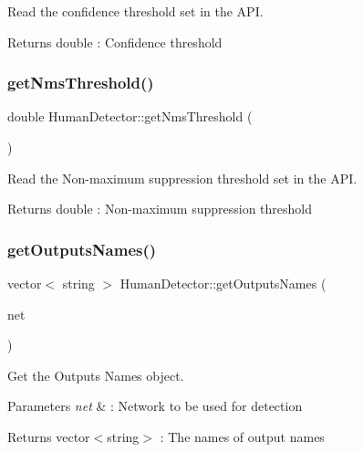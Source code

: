 Read the confidence threshold set in the A\+PI. 

\begin{DoxyReturn}{Returns}
double \+: Confidence threshold 
\end{DoxyReturn}
\mbox{\label{classHumanDetector_a74f85f00e46601ceb2d6942e7ecf41eb}} 
\subsubsection{\texorpdfstring{get\+Nms\+Threshold()}{getNmsThreshold()}}
{\footnotesize\ttfamily double Human\+Detector\+::get\+Nms\+Threshold (\begin{DoxyParamCaption}{ }\end{DoxyParamCaption})}



Read the Non-\/maximum suppression threshold set in the A\+PI. 

\begin{DoxyReturn}{Returns}
double \+: Non-\/maximum suppression threshold 
\end{DoxyReturn}
\mbox{\label{classHumanDetector_a0f42d17cfa9381ce20224fe3ffd25f28}} 
\subsubsection{\texorpdfstring{get\+Outputs\+Names()}{getOutputsNames()}}
{\footnotesize\ttfamily vector$<$ string $>$ Human\+Detector\+::get\+Outputs\+Names (\begin{DoxyParamCaption}\item[{const Net \&}]{net }\end{DoxyParamCaption})}



Get the Outputs Names object. 


\begin{DoxyParams}{Parameters}
{\em net} & \+: Network to be used for detection \\
\hline
\end{DoxyParams}
\begin{DoxyReturn}{Returns}
vector$<$string$>$ \+: The names of output names 
\end{DoxyReturn}
\mbox{\label{classHumanDetector_a2246eb43446bfb27f8af71842b0e8215}} 
